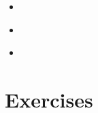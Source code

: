\documentclass{beamer}
\begin{document}
\begin{frame}{}
\begin{itemize}
    \item
\end{itemize}
\end{frame}

\begin{frame}{}
\begin{itemize}
    \item
\end{itemize}
\end{frame}

\begin{frame}{}
\begin{itemize}
    \item
\end{itemize}
\end{frame}


\section{Exercises}
\end{document}
